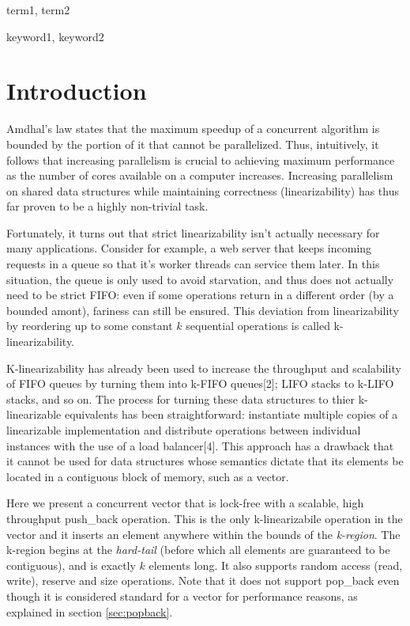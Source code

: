 \documentclass{sigplanconf}
\begin{document}

\terms
term1, term2

\keywords
keyword1, keyword2

\section{Introduction}

Amdhal's law states that the maximum speedup of a concurrent algorithm is bounded by the portion of it that cannot be parallelized. Thus, intuitively, it follows that increasing parallelism is crucial to achieving maximum performance as the number of cores available on a computer increases. Increasing parallelism on shared data structures while maintaining correctness (linearizability) has thus far proven to be a highly non-trivial task.

Fortunately, it turns out that strict linearizability isn't actually necessary for many applications. Consider for example, a web server that keeps incoming requests in a queue so that it's worker threads can service them later. In this situation, the queue is only used to avoid starvation, and thus does not actually need to be strict FIFO: even if some operations return in a different order (by a bounded amont), fariness can still be ensured. This deviation from linearizability by reordering up to some constant $k$ sequential operations is called k-linearizability.

K-linearizability has already been used to increase the throughput and scalability of FIFO queues by turning them into k-FIFO queues[2]; LIFO stacks to k-LIFO stacks, and so on. The process for turning these data structures to thier k-linearizable equivalents has been straightforward: instantiate multiple copies of a linearizable implementation and distribute operations between individual instances with the use of a load balancer[4]. This approach has a drawback that it cannot be used for data structures whose semantics dictate that its elements be located in a contiguous block of memory, such as a vector.

Here we present a concurrent vector that is lock-free with a scalable, high throughput push\_back operation. This is the only k-linearizabile operation in the vector and it inserts an element anywhere within the bounds of the \emph{k-region}. The k-region begins at the \emph{hard-tail} (before which all elements are guaranteed to be contiguous), and is exactly $k$ elements long. It also supports random access (read, write), reserve and size operations. Note that it does not support pop\_back even though it is considered standard for a vector for performance reasons, as explained in section \autoref{sec:popback}.
\end{document}
